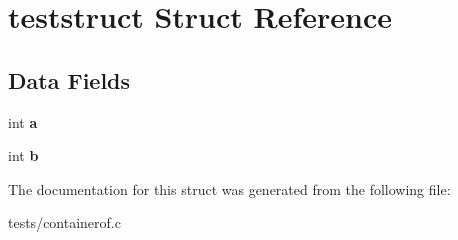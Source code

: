 \hypertarget{structteststruct}{}\section{teststruct Struct Reference}
\label{structteststruct}
\subsection*{Data Fields}
\begin{DoxyCompactItemize}
\item 
int {\bfseries a}\hypertarget{structteststruct_aa4c2a5552e9bc49b1816ff532f558c74}{}\label{structteststruct_aa4c2a5552e9bc49b1816ff532f558c74}

\item 
int {\bfseries b}\hypertarget{structteststruct_a148e3876077787926724625411d6e7a9}{}\label{structteststruct_a148e3876077787926724625411d6e7a9}

\end{DoxyCompactItemize}


The documentation for this struct was generated from the following file\+:\begin{DoxyCompactItemize}
\item 
tests/containerof.\+c\end{DoxyCompactItemize}
